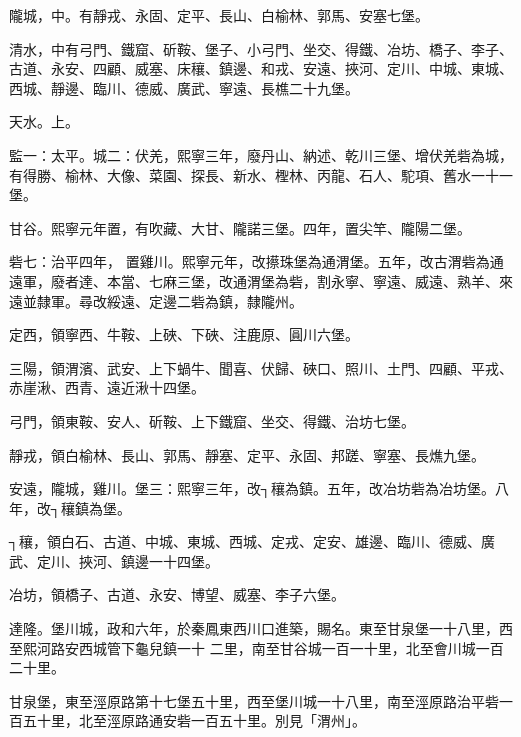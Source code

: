 \begin{pinyinscope}
 隴城，中。有靜戎、永固、定平、長山、白榆林、郭馬、安塞七堡。



 清水，中有弓門、鐵窟、斫鞍、堡子、小弓門、坐交、得鐵、冶坊、橋子、李子、古道、永安、四顧、威塞、床穰、鎮邊、和戎、安遠、挾河、定川、中城、東城、西城、靜邊、臨川、德威、廣武、寧遠、長樵二十九堡。



 天水。上。



 監一：太平。城二：伏羌，熙寧三年，廢丹山、納述、乾川三堡、增伏羌砦為城，有得勝、榆林、大像、菜園、探長、新水、檉林、丙龍、石人、駝項、舊水一十一堡。



 甘谷。熙寧元年置，有吹藏、大甘、隴諾三堡。四年，置尖竿、隴陽二堡。



 砦七：治平四年，
 置雞川。熙寧元年，改攃珠堡為通渭堡。五年，改古渭砦為通遠軍，廢者達、本當、七麻三堡，改通渭堡為砦，割永寧、寧遠、威遠、熟羊、來遠並隸軍。尋改綏遠、定邊二砦為鎮，隸隴州。



 定西，領寧西、牛鞍、上硤、下硤、注鹿原、圓川六堡。



 三陽，領渭濱、武安、上下蝸牛、聞喜、伏歸、硤口、照川、土門、四顧、平戎、赤崖湫、西青、遠近湫十四堡。



 弓門，領東鞍、安人、斫鞍、上下鐵窟、坐交、得鐵、治坊七堡。



 靜戎，領白榆林、長山、郭馬、靜塞、定平、永固、邦蹉、寧塞、長燋九堡。



 安遠，隴城，雞川。堡三：熙寧三年，改┐穰為鎮。五年，改冶坊砦為冶坊堡。八年，改┐穰鎮為堡。



 ┐穰，領白石、古道、中城、東城、西城、定戎、定安、雄邊、臨川、德威、廣武、定川、挾河、鎮邊一十四堡。



 冶坊，領橋子、古道、永安、博望、威塞、李子六堡。



 達隆。堡川城，政和六年，於秦鳳東西川口進築，賜名。東至甘泉堡一十八里，西至熙河路安西城管下龜兒鎮一十
 二里，南至甘谷城一百一十里，北至會川城一百二十里。



 甘泉堡，東至涇原路第十七堡五十里，西至堡川城一十八里，南至涇原路治平砦一百五十里，北至涇原路通安砦一百五十里。別見「渭州」。




\end{pinyinscope}
